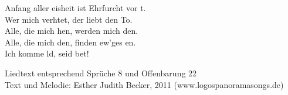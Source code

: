  Anfang aller eisheit ist Ehrfurcht vor t.\\
Wer mich verhtet, der liebt den To.\\
Alle, die mich hen, werden mich den.\\
Alle, die mich den, finden ew'ges en.\\
Ich komme ld, seid bet!\\

\begin{footnotesize}
Liedtext entsprechend Sprüche 8 und Offenbarung 22\\
Text und Melodie: Esther Judith Becker, 2011 (www.logospanoramasongs.de)
\end{footnotesize}